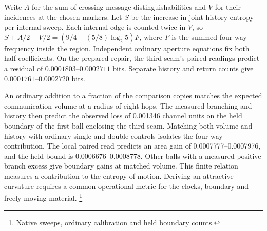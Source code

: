 \documentclass[11pt]{article}
\begin{document}
Write $A$ for the sum of crossing message distinguishabilities and
$V$ for their incidences at the chosen markers. Let $S$ be the
increase in joint history entropy per internal sweep. Each internal
edge is counted twice in $V$, so
$S+A/2-V/2=(9/4-(5/8)\log_2 5) F$,
where $F$ is the summed four-way frequency inside the region.
Independent ordinary aperture equations fix both half coefficients.
On the prepared repair, the third seam's paired readings predict
a residual of $0.0001803$--$0.0002711$ bits. Separate history and
return counts give $0.0001761$--$0.0002720$ bits.

An ordinary addition to a fraction of the comparison copies matches
the expected communication volume at a radius of eight hops.
The measured branching and history then predict the observed loss
of 0.001346 channel units on the held boundary of the first ball
enclosing the third seam. Matching both volume and history with
ordinary single and double controls isolates the four-way contribution. The local paired read predicts an area gain of 0.0007777--0.0007976,
and the held bound is 0.0006676--0.0008778. Other balls with a measured positive
branch excess give boundary gains at matched volume. This finite
relation measures a contribution to the entropy of motion. Deriving
an attractive curvature requires a common operational metric for
the clocks, boundary and freely moving material.%
\footnote{\href{https://github.com/FloatingPragma/observer-patch-holography/blob/main/model/experiments/interval_echo_shell_flux/product_address/green_response/material_recoil/overlap_source/native_boundary/stock/aperture/MOVING_RESULTS.md}{Native sweeps, ordinary calibration and held boundary counts}.}
\end{document}
